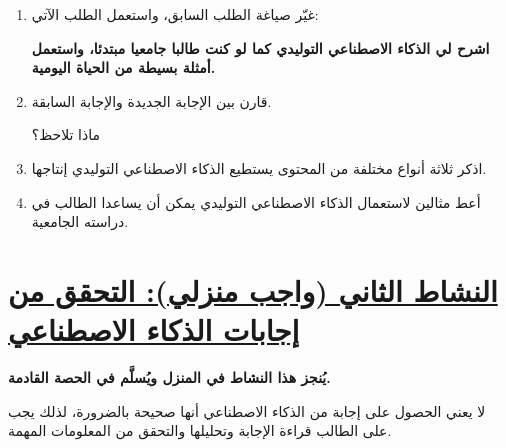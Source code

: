 \documentclass[a4paper]{article}
\begin{document}
\begin{enumerate}
\begin{center}
{\begin{tabular}
\end{tabular}

}

\end{center}



\item غيّر صياغة الطلب السابق، واستعمل الطلب الآتي:

\begin{center}

\textbf{
اشرح لي الذكاء الاصطناعي التوليدي كما لو كنت طالبا
جامعيا مبتدئا، واستعمل أمثلة بسيطة من الحياة اليومية.
}

\end{center}


\item قارن بين الإجابة الجديدة والإجابة السابقة.

ماذا تلاحظ؟


\item اذكر ثلاثة أنواع مختلفة من المحتوى يستطيع
الذكاء الاصطناعي التوليدي إنتاجها.


\item أعط مثالين لاستعمال الذكاء الاصطناعي التوليدي
يمكن أن يساعدا الطالب في دراسته الجامعية.



\end{enumerate}

\newpage

\section*{\khatt\underline{النشاط الثاني (واجب منزلي): التحقق من إجابات الذكاء الاصطناعي}}

\textbf{يُنجز هذا النشاط في المنزل ويُسلَّم في الحصة القادمة.}

لا يعني الحصول على إجابة من الذكاء الاصطناعي أنها صحيحة
بالضرورة، لذلك يجب على الطالب قراءة الإجابة وتحليلها
والتحقق من المعلومات المهمة.
\end{document}
